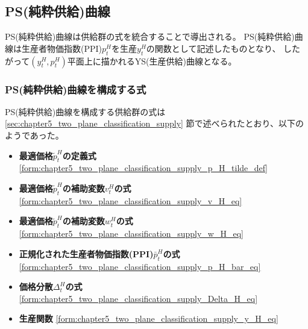 
\subsection{PS(純粋供給)曲線}
\label{sec:chapter5_two_plane_ps}
PS(純粋供給)曲線は供給群の式を統合することで導出される。
PS(純粋供給)曲線は生産者物価指数(PPI)\(p_t^H\)を生産\(y_t^H\)の関数として記述したものとなり、
したがって\((y_t^H,p_t^H)\)平面上に描かれるYS(生産供給)曲線となる。

\subsubsection{PS(純粋供給)曲線を構成する式}
\label{sec:chapter5_two_plane_ps_components}
PS(純粋供給)曲線を構成する供給群の式は
\ref{sec:chapter5_two_plane_classification_supply}
節で述べられたとおり、以下のようであった。
\begin{itemize}
    \item \textbf{最適価格\(\widetilde{p}_t^H\)の定義式} \eqref{form:chapter5_two_plane_classification_supply_p_H_tilde_def}
    \item \textbf{最適価格\(\widetilde{p}_t^H\)の補助変数\(v_t^H\)の式} \eqref{form:chapter5_two_plane_classification_supply_v_H_eq}
    \item \textbf{最適価格\(\widetilde{p}_t^H\)の補助変数\(w_t^H\)の式} \eqref{form:chapter5_two_plane_classification_supply_w_H_eq}
    \item \textbf{正規化された生産者物価指数(PPI)\(\bar{p}_t^H\)の式} \eqref{form:chapter5_two_plane_classification_supply_p_H_bar_eq}
    \item \textbf{価格分散\(\Delta_t^H\)の式} \eqref{form:chapter5_two_plane_classification_supply_Delta_H_eq}
    \item \textbf{生産関数} \eqref{form:chapter5_two_plane_classification_supply_y_H_eq}
\end{itemize}

